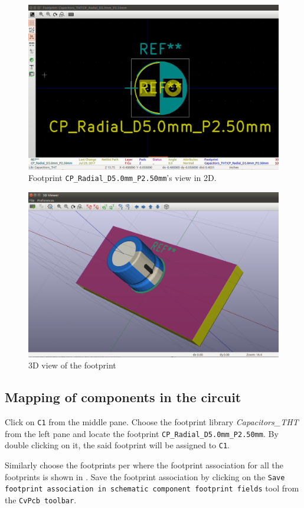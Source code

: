 \begin{figure}
\centering
\includegraphics[width=\lgfig]{manual_images/2dviewofcp.png}
\caption{Footprint \texttt{CP\_Radial\_D5.0mm\_P2.50mm}'s view in 2D.}
\label{2dview}
\end{figure}
\begin{figure}
\centering
\includegraphics[width=\lgfig]{manual_images/3dv.png}
\caption{3D view of the footprint}
\label{3dv}
\end{figure}

\subsection{Mapping of components in the circuit}

\begin{compactenum}
\item Click on {\tt C1} from the middle pane. Choose the footprint  library \textit{Capacitors\_THT}
from the left pane and locate the footprint \linebreak \texttt{CP\_Radial\_D5.0mm\_P2.50mm}. By double clicking on it, the said footprint will be assigned to {\tt C1}.
\item Similarly choose the footprints per  where the footprint association for all the footprints is shown in . Save the footprint association by clicking on the
\texttt{Save footprint association in schematic component footprint fields} tool from the {\tt CvPcb toolbar}. 
\end{compactenum}


